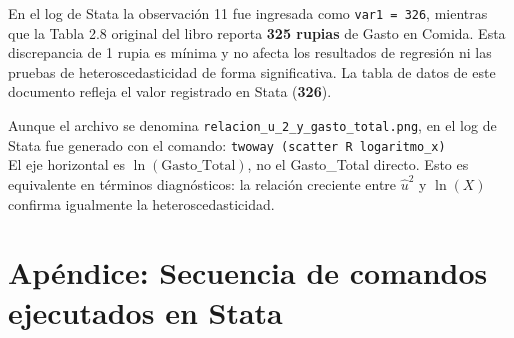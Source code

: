 \documentclass[12pt,a4paper]{article}
\begin{document}
\begin{cajaresultado}[title=Nota sobre la Observación 11]
En el log de Stata la observación 11 fue ingresada como \texttt{var1 = 326}, mientras que
la Tabla 2.8 original del libro reporta \textbf{325 rupias} de Gasto en Comida.
Esta discrepancia de 1 rupia es mínima y no afecta los resultados de regresión
ni las pruebas de heteroscedasticidad de forma significativa.
La tabla de datos de este documento refleja el valor registrado en Stata (\textbf{326}).
\end{cajaresultado}

\begin{cajaresultado}[title=Nota sobre el gráfico \texttt{relacion\_u\_2\_y\_gasto\_total.png}]
Aunque el archivo se denomina \texttt{relacion\_u\_2\_y\_gasto\_total.png},
en el log de Stata fue generado con el comando:
\quad \texttt{twoway (scatter R logaritmo\_x)}\\
El eje horizontal es $\ln(\text{Gasto\_Total})$, no el Gasto\_Total directo.
Esto es equivalente en términos diagnósticos: la relación creciente entre
$\hat{u}^2$ y $\ln(X)$ confirma igualmente la heteroscedasticidad.
\end{cajaresultado}

\section{Apéndice: Secuencia de comandos ejecutados en Stata}
\end{document}
